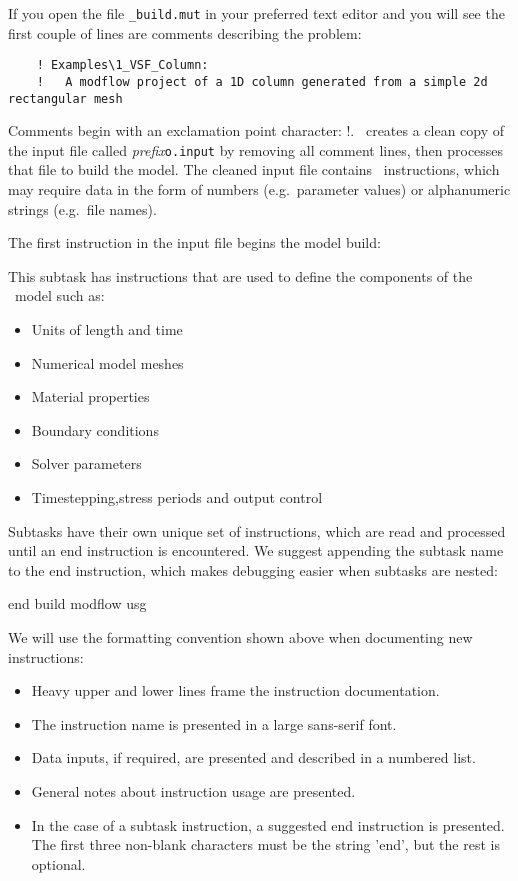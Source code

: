 If you open the file \texttt{\_build.mut} in your preferred text editor and you will see the first couple of lines are comments describing the problem:
\squish
\begin{verbatim}
    ! Examples\1_VSF_Column:
    !   A modflow project of a 1D column generated from a simple 2d rectangular mesh
\end{verbatim}
Comments begin with an exclamation point character: !\hspace{.1in}.  \mut\ creates a  clean copy of the input file called \textit{prefix}\verb+o.input+ by removing all comment lines, then processes that file to build the model. The cleaned input file contains \mut\ instructions, which may require data in the form of numbers (e.g.\ parameter values) or alphanumeric strings (e.g.\ file names).

The first instruction in the input file begins the model build:

    {This subtask has instructions that are used to define the components of the \mfus\ model such as:
     \begin{itemize}
        \item Units of length and time
        \item Numerical model meshes
        \item Material properties
        \item Boundary conditions
        \item Solver parameters
        \item Timestepping,stress periods and output control
    \end{itemize}
    Subtasks have their own unique set of instructions, which are read and processed until an \textsf{end} instruction is encountered.  We suggest appending the subtask name to the \textsf{end} instruction, which makes debugging easier when subtasks are nested:

    {\Large \sf end build modflow usg}
    }

We will use the formatting convention shown above when documenting new instructions:
\begin{itemize}
  \item Heavy upper and lower lines frame the instruction documentation.
  \item The instruction name is presented in a large sans-serif font.
  \item Data inputs, if required, are presented and described in a numbered list.
  \item General notes about instruction usage are presented.
  \item In the case of a subtask instruction, a suggested \textsf{end} instruction is presented.  The first three non-blank characters must be the string 'end', but the rest is optional.
\end{itemize}

